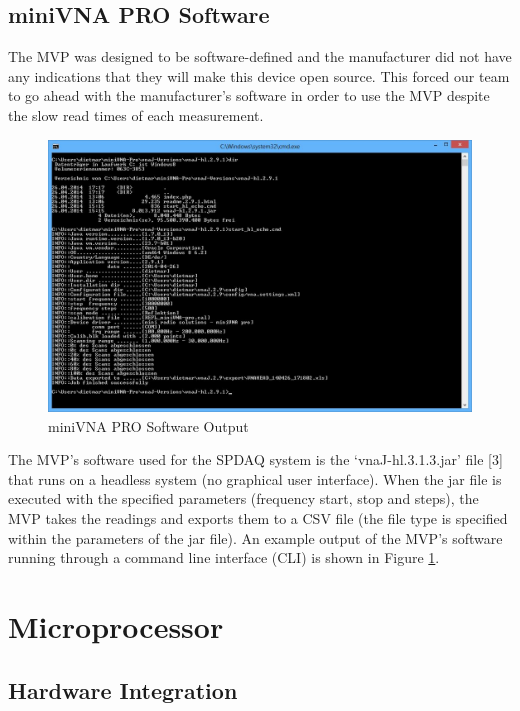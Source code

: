 \clearpage{}
\section{miniVNA PRO Software}

The MVP was designed to be software-defined and the manufacturer did not have any indications that they will make this device
open source. This forced our team to go ahead with the manufacturer’s software in order to use the MVP despite the slow read
times of each measurement.
\newline

\begin{figure}[h]
\begin{center}
\includegraphics[width=4.5in]{./images/cli.jpg}
\caption{miniVNA PRO Software Output}
\label{fig:cli}
\end{center}
\end{figure}

The MVP’s software used for the SPDAQ system is the ‘vnaJ-hl.3.1.3.jar’ file [3] that runs on a headless system (no graphical
user interface). When the jar file is executed with the specified parameters (frequency start, stop and steps), the MVP takes
the readings and exports them to a CSV file (the file type is specified within the parameters of the jar file).  An example
output of the MVP’s software running through a command line interface (CLI) is shown in Figure \ref{fig:cli}.



\chapter{Microprocessor}
\label{sec:software}


\section{Hardware Integration}

